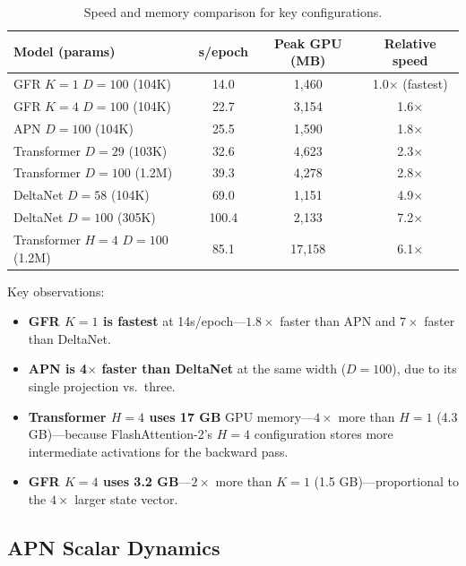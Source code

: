\documentclass[11pt,a4paper]{article}
\begin{document}
\begin{table}[h]
\centering
\caption{Speed and memory comparison for key configurations.}
\label{tab:speed_memory}
\begin{tabular}{lccc}
\toprule
\textbf{Model (params)} & \textbf{s/epoch} & \textbf{Peak GPU (MB)} & \textbf{Relative speed} \\
\midrule
GFR $K{=}1$ $D{=}100$ (104K) & 14.0 & 1,460 & 1.0$\times$ (fastest) \\
GFR $K{=}4$ $D{=}100$ (104K) & 22.7 & 3,154 & 1.6$\times$ \\
APN $D{=}100$ (104K) & 25.5 & 1,590 & 1.8$\times$ \\
Transformer $D{=}29$ (103K) & 32.6 & 4,623 & 2.3$\times$ \\
Transformer $D{=}100$ (1.2M) & 39.3 & 4,278 & 2.8$\times$ \\
DeltaNet $D{=}58$ (104K) & 69.0 & 1,151 & 4.9$\times$ \\
DeltaNet $D{=}100$ (305K) & 100.4 & 2,133 & 7.2$\times$ \\
Transformer $H{=}4$ $D{=}100$ (1.2M) & 85.1 & 17,158 & 6.1$\times$ \\
\bottomrule
\end{tabular}
\end{table}

Key observations:
\begin{itemize}
\item \textbf{GFR $K{=}1$ is fastest} at 14s/epoch---$1.8\times$ faster than APN and $7\times$ faster than DeltaNet.
\item \textbf{APN is 4$\times$ faster than DeltaNet} at the same width ($D{=}100$), due to its single projection vs.\ three.
\item \textbf{Transformer $H{=}4$ uses 17 GB} GPU memory---$4\times$ more than $H{=}1$ (4.3 GB)---because FlashAttention-2's $H{=}4$ configuration stores more intermediate activations for the backward pass.
\item \textbf{GFR $K{=}4$ uses 3.2 GB}---$2\times$ more than $K{=}1$ (1.5 GB)---proportional to the $4\times$ larger state vector.
\end{itemize}

\subsection{APN Scalar Dynamics}
\end{document}
